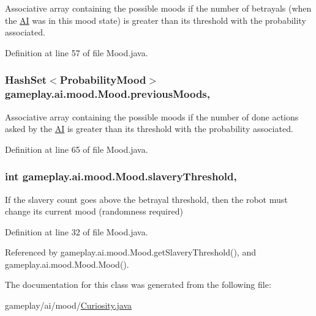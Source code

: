 Associative array containing the possible moods if the number of betrayals (when the \hyperlink{a00001}{A\-I} was in this mood state) is greater than its threshold with the probability associated. 



Definition at line 57 of file Mood.\-java.

\hypertarget{a00015_a5c8758b18bb740a2fd1edf8d57a5ab27}{
\subsubsection[{previous\-Moods}]{\setlength{\rightskip}{0pt plus 5cm}Hash\-Set$<${\bf Probability\-Mood}$>$ gameplay.\-ai.\-mood.\-Mood.\-previous\-Moods\hspace{0.3cm}{\ttfamily [protected]}, {\ttfamily [inherited]}}}\label{a00015_a5c8758b18bb740a2fd1edf8d57a5ab27}


Associative array containing the possible moods if the number of done actions asked by the \hyperlink{a00001}{A\-I} is greater than its threshold with the probability associated. 



Definition at line 65 of file Mood.\-java.

\hypertarget{a00015_a12c9abed7c077f9013956cda08e41619}{
\subsubsection[{slavery\-Threshold}]{\setlength{\rightskip}{0pt plus 5cm}int gameplay.\-ai.\-mood.\-Mood.\-slavery\-Threshold\hspace{0.3cm}{\ttfamily [protected]}, {\ttfamily [inherited]}}}\label{a00015_a12c9abed7c077f9013956cda08e41619}


If the slavery count goes above the betrayal threshold, then the robot must change its current mood (randomness required) 



Definition at line 32 of file Mood.\-java.



Referenced by gameplay.\-ai.\-mood.\-Mood.\-get\-Slavery\-Threshold(), and gameplay.\-ai.\-mood.\-Mood.\-Mood().



The documentation for this class was generated from the following file\-:\begin{DoxyCompactItemize}
\item 
gameplay/ai/mood/\hyperlink{a00045}{Curiosity.\-java}\end{DoxyCompactItemize}
